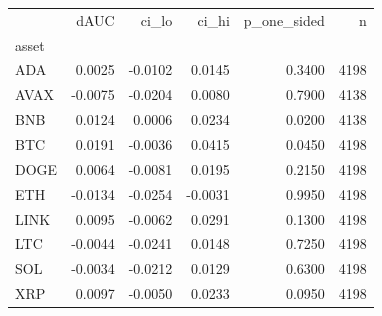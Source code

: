 \begin{tabular}{lrrrrr}
\toprule
 & dAUC & ci_lo & ci_hi & p_one_sided & n \\
asset &  &  &  &  &  \\
\midrule
ADA & 0.0025 & -0.0102 & 0.0145 & 0.3400 & 4198 \\
AVAX & -0.0075 & -0.0204 & 0.0080 & 0.7900 & 4138 \\
BNB & 0.0124 & 0.0006 & 0.0234 & 0.0200 & 4138 \\
BTC & 0.0191 & -0.0036 & 0.0415 & 0.0450 & 4198 \\
DOGE & 0.0064 & -0.0081 & 0.0195 & 0.2150 & 4198 \\
ETH & -0.0134 & -0.0254 & -0.0031 & 0.9950 & 4198 \\
LINK & 0.0095 & -0.0062 & 0.0291 & 0.1300 & 4198 \\
LTC & -0.0044 & -0.0241 & 0.0148 & 0.7250 & 4198 \\
SOL & -0.0034 & -0.0212 & 0.0129 & 0.6300 & 4198 \\
XRP & 0.0097 & -0.0050 & 0.0233 & 0.0950 & 4198 \\
\bottomrule
\end{tabular}
